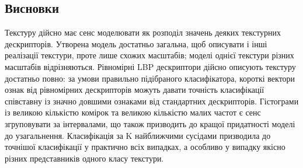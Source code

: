 \begin{figure}[h]
    \caption{}
    \label{fig:precision-3}
\end{figure}


\subsection{Висновки}\label{section2.1f}

Текстуру дійсно має сенс моделювати як розподіл значень деяких текстурних дескрипторів.
Утворена модель достатньо загальна, щоб описувати і інші реалізації текстури, проте лише схожих масштабів; 
моделі однієї текстури різних масштабів відрізняються.
Рівномірні LBP дескриптори дійсно описують текстуру достатньо повно: за умови правильно підібраного класифікатора, короткі вектори ознак від рівномірних дескрипторів можуть давати точність класифікації 
співставну із значно довшими ознаками від стандартних дескрипторів. 
Гістограми із великою кількістю комірок та великою кількістю малих частот є сенс згруповувати за інтервалами, що також призводить до кращої придатності моделі до узагальнення.
Класифікація за K найближчими сусідами призводила до точнішої класифікації у практично всіх випадках, а особливо у випадку якісно різних представників одного класу текстури.
